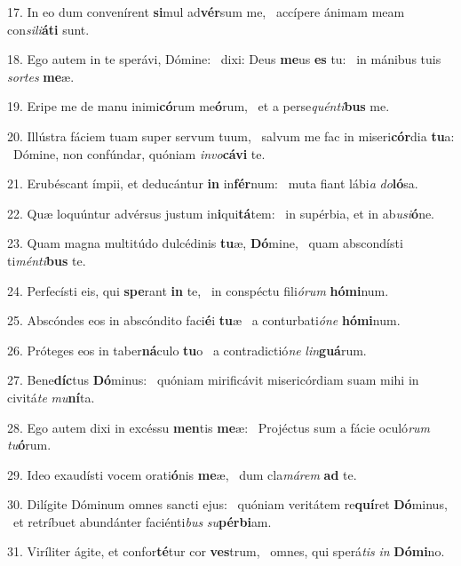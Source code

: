 17. In eo dum convenírent \textbf{si}mul ad\textbf{vér}sum me, \ast\  accípere ánimam meam con\textit{si}\textit{li}\textbf{á}\textbf{ti} sunt.\

18. Ego autem in te sperávi, Dómine: \dag\  dixi: Deus \textbf{me}us \textbf{es} tu: \ast\  in mánibus tuis \textit{sor}\textit{tes} \textbf{me}æ.\

19. Eripe me de manu inimi\textbf{có}rum me\textbf{ó}rum, \ast\  et a perse\textit{quén}\textit{ti}\textbf{bus} me.\

20. Illústra fáciem tuam super servum tuum, \dag\  salvum me fac in miseri\textbf{cór}dia \textbf{tu}a: \ast\  Dómine, non confúndar, quóniam \textit{in}\textit{vo}\textbf{cá}\textbf{vi} te.\

21. Erubéscant ímpii, et deducántur \textbf{in} in\textbf{fér}num: \ast\  muta fiant lábi\textit{a} \textit{do}\textbf{ló}sa.\

22. Quæ loquúntur advérsus justum in\textbf{i}qui\textbf{tá}tem: \ast\  in supérbia, et in ab\textit{u}\textit{si}\textbf{ó}ne.\

23. Quam magna multitúdo dulcédinis \textbf{tu}æ, \textbf{Dó}mine, \ast\  quam abscondísti ti\textit{mén}\textit{ti}\textbf{bus} te.\

24. Perfecísti eis, qui \textbf{spe}rant \textbf{in} te, \ast\  in conspéctu fili\textit{ó}\textit{rum} \textbf{hó}\textbf{mi}num.\

25. Abscóndes eos in abscóndito faci\textbf{é}i \textbf{tu}æ \ast\  a conturbati\textit{ó}\textit{ne} \textbf{hó}\textbf{mi}num.\

26. Próteges eos in taber\textbf{ná}culo \textbf{tu}o \ast\  a contradictió\textit{ne} \textit{lin}\textbf{guá}rum.\

27. Bene\textbf{díc}tus \textbf{Dó}minus: \ast\  quóniam mirificávit misericórdiam suam mihi in civitá\textit{te} \textit{mu}\textbf{ní}ta.\

28. Ego autem dixi in excéssu \textbf{men}tis \textbf{me}æ: \ast\  Projéctus sum a fácie oculó\textit{rum} \textit{tu}\textbf{ó}rum.\

29. Ideo exaudísti vocem orati\textbf{ó}nis \textbf{me}æ, \ast\  dum cla\textit{má}\textit{rem} \textbf{ad} te.\

30. Dilígite Dóminum omnes sancti ejus: \dag\  quóniam veritátem re\textbf{quí}ret \textbf{Dó}minus, \ast\  et retríbuet abundánter faciénti\textit{bus} \textit{su}\textbf{pér}\textbf{bi}am.\

31. Viríliter ágite, et confor\textbf{té}tur cor \textbf{ves}trum, \ast\  omnes, qui sperá\textit{tis} \textit{in} \textbf{Dó}\textbf{mi}no.\

